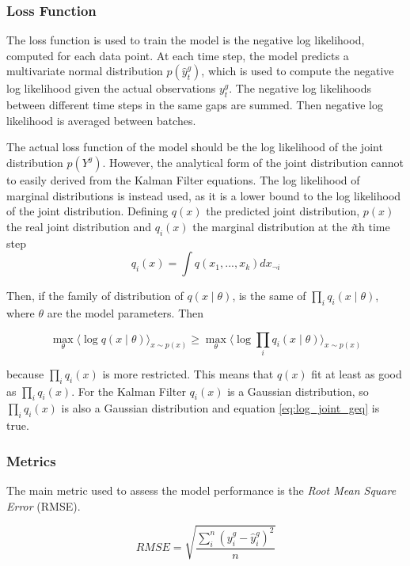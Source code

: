 \documentclass{article}
\newcommand{\E}[1]{\langle #1 \rangle} %
\begin{document}
\subsubsection{Loss Function}

The loss function is used to train the model is the negative log likelihood, computed for each data point. At each time step, the model predicts a multivariate normal distribution $p(\hat{y}^g_t)$, which is used to compute the negative log likelihood given the actual observations $y_t^g$. The negative log likelihoods between different time steps in the same gaps are summed. Then negative log likelihood is averaged between batches.

The actual loss function of the model should be the log likelihood of the joint distribution $p(Y^g)$. However, the analytical form of the joint distribution cannot to easily derived from the Kalman Filter equations. The log likelihood of marginal distributions is instead used, as it is a lower bound to the log likelihood of the joint distribution. Defining $q(x)$ the predicted joint distribution, $p(x)$ the real joint distribution and $q_i(x)$ the marginal distribution at the \textit{i}th time step
\begin{equation}
    q_i(x) = \int q(x_1, ..., x_k)dx_{\neg i}
\end{equation}

Then, if the family of distribution of $q(x \mid \theta)$,  is the same of $\prod_i q_i(x \mid \theta)$, where $\theta$ are the model parameters. Then

\begin{equation}\label{eq:log_joint_geq}
    \max_\theta \E{\log q(x\mid \theta)}_{x \sim p(x)} \geq \max_\theta \E{\log \prod_i q_i(x\mid \theta)}_{x \sim p(x)}
\end{equation}

because $\prod_i q_i(x)$ is more restricted. This means that $q(x)$ fit at least as good as $\prod_i q_i(x)$.
For the Kalman Filter $q_i(x)$ is a Gaussian distribution, so $\prod_i q_i(x)$ is also a Gaussian distribution and equation \ref{eq:log_joint_geq} is true.

\subsubsection{Metrics}

The main metric used to assess the model performance is the \emph{Root Mean Square Error} (RMSE). 

\begin{equation}
    RMSE = \sqrt{\frac{\sum_i^n (y^g_i - \hat{y}^g_i)^2}{n}}
\end{equation}
\end{document}
